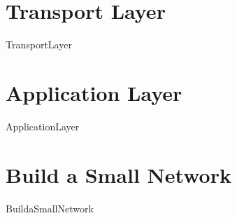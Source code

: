 \documentclass{article}
\begin{document}
\section{Transport Layer}
{TransportLayer}

\section{Application Layer}
{ApplicationLayer}

\section{Build a Small Network}
{BuildaSmallNetwork}

\newpage
\printnoidxglossary[type=acronym]
\printnoidxglossary[type=tem]
\printnoidxglossary[type=cmd]
\listoffigures
\end{document}
